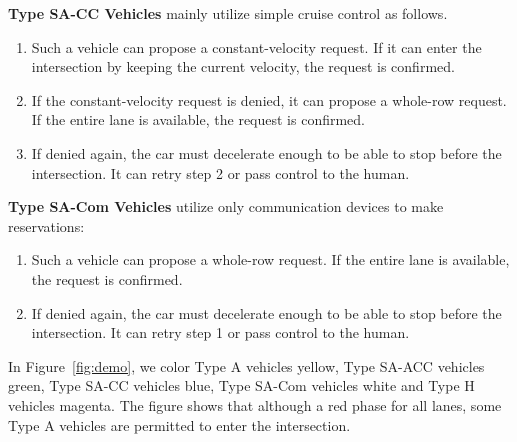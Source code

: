 \noindent
\textbf{Type SA-CC Vehicles} mainly utilize simple cruise control as follows.
\begin{enumerate}

\item Such a vehicle can propose a constant-velocity request. If it
can enter the intersection by keeping the current velocity, the
request is confirmed.

\item If the constant-velocity request is denied, it can propose a whole-row
  request. If the entire lane is available, the request is confirmed.

\item If denied again, the car must decelerate enough to be able to
stop before the intersection.  It can retry step 2 or pass control to
the human.

\end{enumerate}

\noindent
\textbf{Type SA-Com Vehicles} utilize only communication devices
to make reservations:
\begin{enumerate}

\item Such a vehicle can propose a whole-row request.  If the entire
lane is available, the request is confirmed.

\item If denied again, the car must decelerate enough to be able to
stop before the intersection.  It can retry step 1 or pass control to
the human.

\end{enumerate}

In Figure~\ref{fig:demo}, we color Type A vehicles yellow, Type SA-ACC vehicles
green, Type SA-CC vehicles blue, Type SA-Com vehicles white and Type H
vehicles magenta. The figure shows that although a red phase for all lanes,
some Type A vehicles are permitted to enter the intersection.











